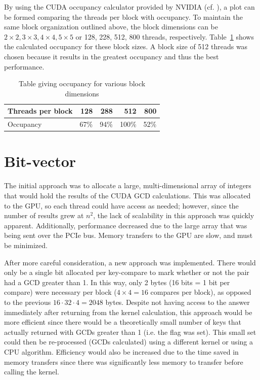 \documentclass[12pt]{ucthesis}
\begin{document}
By using the CUDA occupancy calculator provided by NVIDIA (cf. 
\cite{nvidia2012gpu}), a plot can be formed comparing the threads per block 
with occupancy. To maintain the same block organization outlined above, the 
block dimensions can be $2\times2, 3\times3, 4\times4, 5\times5$ or 128, 228, 
512, 800 threads, respectively. Table~\ref{tab:occupancy} shows the calculated 
occupancy for these block sizes. A block size of 512 threads was chosen 
because it results in the greatest occupancy and thus the best performance. 

\begin{table}
   \centering
   \begin{tabular}{l|rrrr}
      Threads per block & 128 & 288 & 512 & 800\\
      \hline
              Occupancy & 67\% & 94\% & 100\% & 52\%\\
   \end{tabular}
   \caption{Table giving occupancy for various block dimensions}
   \label{tab:occupancy}
\end{table}

\section{Bit-vector}
\label{subsec:bitvector}
The initial approach was to allocate a large, multi-dimensional array of 
integers that would hold the results of the CUDA GCD calculations. This was 
allocated to the GPU, so each thread could have access as needed; however, 
since the number of results grew at $n^2$, the lack of scalability in this 
approach was quickly apparent. Additionally, performance decreased due to the 
large array that was being sent over the PCIe bus. Memory transfers to 
the GPU are slow, and must be minimized.

After more careful consideration, a new approach was implemented. There would 
only be a single bit allocated per key-compare to mark whether or not the pair 
had a GCD greater than 1. In this way, only 2 bytes (16 bits = 1 bit per 
compare) were necessary per block ($4\times4 = 16$ compares per block), as 
opposed to the previous $16 \cdot 32 \cdot 4 = 2048$ bytes. Despite not having access 
to the answer immediately after returning from the kernel calculation, this 
approach would be more efficient since there would be a theoretically small 
number of keys that actually returned with GCDs greater than 1 (i.e. the flag 
was set). This small set could then be re-processed (GCDs calculated) using a 
different kernel or using a CPU algorithm. Efficiency would also be increased 
due to the time saved in memory transfers since there was significantly less 
memory to transfer before calling the kernel.
\end{document}
